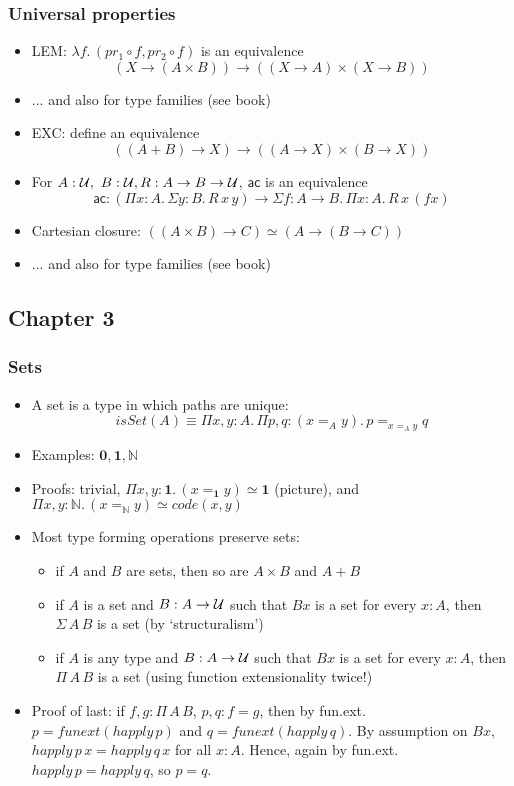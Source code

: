 \documentclass[handout]{beamer}
\newcommand{\depi}[3]{\Pi{#1{:}#2.\,#3}}
\newcommand{\sigm}[3]{\Sigma{#1{:}#2.\,#3}}
\newcommand{\lam}[2]{\lambda{#1.\,#2}}
\newcommand{\Nat}{\mathbb{N}}
\newcommand{\UU}{{\cal U}}
\newcommand{\bfnull}{\mathbf{0}}
\newcommand{\bfone}{\mathbf{1}}
\begin{document}
 \frame
  {

    \frametitle{Universal properties}

    \begin{itemize}[<+->]
    \item LEM: $\lam{f}{(pr_1\circ f, pr_2\circ f )}$ is an equivalence
\[(X\to(A\times B))\to ((X\to A)\times (X\to B))\]
    \item ... and also for type families (see book) 
    \item EXC: define an equivalence
\[((A+ B)\to X)\to ((A\to X)\times (B\to X))\]
    \item For $A:\UU,~B:\UU,R:A\to B\to\UU$, $\mathsf{ac}$ is an equivalence
\[\mathsf{ac}:(\depi{x}{A}{\sigm{y}{B}{R\,x\,y}})\to\sigm{f}{A{\to}B}{\depi{x}{A}{R\,x\,(fx)}}\]
    \item Cartesian closure: $((A\times B)\to C) \simeq (A\to (B\to C))$
    \item ... and also for type families (see book) 
    \end{itemize}
  }

  \subsection{Chapter 3}

 \frame
  {

    \frametitle{Sets}

    \begin{itemize}[<+->]
    \item A set is a type in which paths are unique:
\[isSet(A) \equiv \depi{x,y}{A}{\depi{p,q}{(x=_Ay)}{p=_{x=_Ay}q}}\]
    \item Examples: $\bfnull,\bfone,\Nat$
    \item Proofs: trivial,  $\depi{x,y}{\bfone}{(x=_{\bfone}y)\simeq\bfone}$ (picture),
          and $\depi{x,y}{\Nat}{(x=_{\Nat}y)\simeq code(x,y)}$
    \item Most type forming operations preserve sets:
      \begin{itemize}[<+->]
      \item if $A$ and $B$ are sets, then so are $A\times B$ and $A+B$ 
      \item if $A$ is a set and $B:A\to\UU$ such that $Bx$ is a set for every $x:A$, 
            then $\Sigma\,A\,B$ is a set (by `structuralism')
      \item if $A$ is any type and $B:A\to\UU$ such that $Bx$ is a set for every $x:A$, 
            then $\Pi\,A\,B$ is a set (using function extensionality twice!)
      \end{itemize}
    \item Proof of last: if $f,g: \Pi\,A\,B$,
          $p,q: f=g$, then by fun.ext.\ $p = funext(happly\,p)$
          and $q = funext(happly\,q)$. By assumption on $Bx$, 
          $happly\,p\,x = happly\,q\,x$ for all $x:A$. 
          Hence, again by fun.ext.\ $happly\,p = happly\,q$, so $p=q$. 
    \end{itemize}
  }
\end{document}
